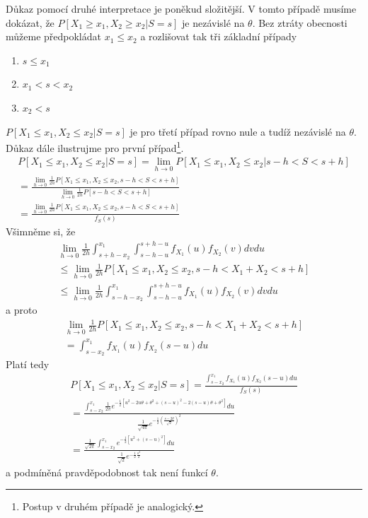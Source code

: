 \begin{example}
Důkaz pomocí druhé interpretace je poněkud složitější. V tomto případě musíme dokázat, že $P[X_1 \ge x_1, X_2 \ge x_2 | S = s]$ je nezávislé na $\theta$. Bez ztráty obecnosti můžeme předpokládat $x_1 \le x_2$ a rozlišovat tak tři základní případy
\begin{enumerate}
\item $s \le x_1$\\
\item $x_1 < s < x_2$\\
\item $x_2 < s$
\end{enumerate}
$P[X_1 \le x_1, X_2 \le x_2 | S = s]$ je pro třetí případ rovno nule a tudíž nezávislé na $\theta$. Důkaz dále ilustrujme pro první případ\footnote{Postup v druhém případě je analogický.}.
\begin{gather*}
P[X_1 \le x_1, X_2 \le x_2 | S = s] = \lim_{h \rightarrow 0}P[X_1 \le x_1, X_2 \le x_2 | s - h < S < s + h]\\
= \frac{\lim_{h \rightarrow 0} \frac{1}{2h} P[X_1 \le x_1, X_2 \le x_2, s - h < S < s + h]}{\lim_{h \rightarrow 0}\frac{1}{2h}P[s - h < S < s + h]}\\
= \frac{\lim_{h \rightarrow 0} \frac{1}{2h} P[X_1 \le x_1, X_2 \le x_2, s - h < S < s + h]}{f_S(s)}
\end{gather*}
Všimněme si, že
\begin{gather*}
\lim_{h \rightarrow 0} \frac{1}{2h} \int_{s + h - x_2}^{x_1} \int_{s - h - u}^{s + h - u} f_{X_1}(u)f_{X_2}(v)dv du\\
\le \lim_{h \rightarrow 0} \frac{1}{2h} P[X_1 \le x_1, X_2 \le x_2, s - h < X_1 + X_2 < s + h]\\
\le \lim_{h \rightarrow 0} \frac{1}{2h} \int_{s - h - x_2}^{x_1} \int_{s - h - u}^{s + h - u}f_{X_1}(u)f_{X_2}(v)dv du
\end{gather*}
a proto
\begin{gather*}
\lim_{h \rightarrow 0}\frac{1}{2h} P[X_1 \le x_1, X_2 \le x_2, s - h < X_1 + X_2 < s + h]\\
= \int_{s - x_2}^{x_1} f_{X_1}(u)f_{X_2}(s - u)du
\end{gather*}
Platí tedy
\begin{gather*}
P[X_1 \le x_1, X_2 \le x_2 | S = s] = \frac{\int_{s - x_2}^{x_1}f_{X_1}(u)f_{X_2}(s - u)du}{f_S(s)}\\
= \frac{\int_{s - x_2}^{x_1} \frac{1}{2 \pi} e^{-\frac{1}{2}[u^2 - 2u\theta + \theta^2 + (s - u)^2 - 2(s - u)\theta + \theta^2]}du}{\frac{1}{\sqrt{4 \pi}}e^{-\frac{1}{2}\left(\frac{s - 2\theta}{\sqrt{2}}\right)^2}}\\
= \frac{\frac{1}{\sqrt{2 \pi}} \int_{s - x_2}^{x_1} e^{-\frac{1}{2}[u^2 + (s - u)^2]}du}{\frac{1}{\sqrt{2}}e^{-\frac{1}{2}\frac{s^2}{2}}}
\end{gather*}
a podmíněná pravděpodobnost tak není funkcí $\theta$.
\end{example}

